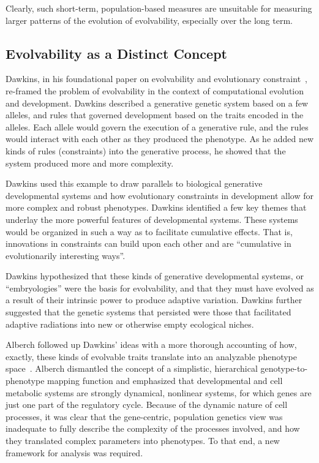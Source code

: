\documentclass[PhD]{msu-thesis}
\begin{document}
Clearly, such short-term, population-based measures are unsuitable for measuring larger patterns of the evolution of evolvability, especially over the long term.

\subsection{Evolvability as a Distinct Concept}
Dawkins, in his foundational paper on evolvability and evolutionary constraint~\cite{dawkins_13_2003}, re-framed the problem of evolvability in the context of computational evolution and development. Dawkins described a generative genetic system based on a few alleles, and rules that governed development based on the traits encoded in the alleles. Each allele would govern the execution of a generative rule, and the rules would interact with each other as they produced the phenotype. As he added new kinds of rules (constraints) into the generative process, he showed that the system produced more and more complexity.

Dawkins used this example to draw parallels to biological generative developmental systems and how evolutionary constraints in development allow for more complex and robust phenotypes. Dawkins identified a few key themes that underlay the more powerful features of developmental systems. These systems would be organized in such a way as to facilitate cumulative effects. That is, innovations in constraints can build upon each other and are “cumulative in evolutionarily interesting ways”\cite{dawkins_13_2003}.

Dawkins hypothesized that these kinds of generative developmental systems, or “embryologies” were the basis for evolvability, and that they must have evolved as a result of their intrinsic power to produce adaptive variation. Dawkins further suggested that the genetic systems that persisted were those that facilitated adaptive radiations into new or otherwise empty ecological niches.

Alberch followed up Dawkins’ ideas with a more thorough accounting of how, exactly, these kinds of evolvable traits translate into an analyzable phenotype space~\cite{alberch_genes_1991}. Alberch dismantled the concept of a simplistic, hierarchical genotype-to-phenotype mapping function and emphasized that developmental and cell metabolic systems are strongly dynamical, nonlinear systems, for which genes are just one part of the regulatory cycle. Because of the dynamic nature of cell processes, it was clear that the gene-centric, population genetics view was inadequate to fully describe the complexity of the processes involved, and how they translated complex parameters into phenotypes. To that end, a new framework for analysis was required.
\end{document}
